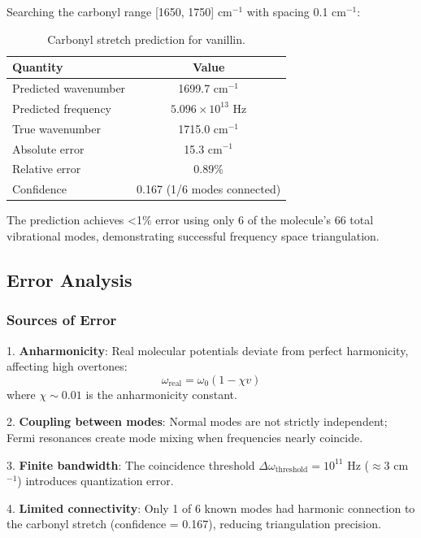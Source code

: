 Searching the carbonyl range [1650, 1750] cm$^{-1}$ with spacing 0.1 cm$^{-1}$:

\begin{table}[h]
\centering
\begin{tabular}{|l|c|}
\hline
\textbf{Quantity} & \textbf{Value} \\
\hline
Predicted wavenumber & 1699.7 cm$^{-1}$ \\
Predicted frequency & $5.096 \times 10^{13}$ Hz \\
True wavenumber & 1715.0 cm$^{-1}$ \\
Absolute error & 15.3 cm$^{-1}$ \\
Relative error & 0.89\% \\
Confidence & 0.167 (1/6 modes connected) \\
\hline
\end{tabular}
\caption{Carbonyl stretch prediction for vanillin.}
\end{table}

The prediction achieves <1\% error using only 6 of the molecule's 66 total vibrational modes, demonstrating successful frequency space triangulation.

\subsection{Error Analysis}

\subsubsection{Sources of Error}

1. \textbf{Anharmonicity}: Real molecular potentials deviate from perfect harmonicity, affecting high overtones:
\begin{equation}
\omega_{\text{real}} = \omega_0(1 - \chi v)
\end{equation}
where $\chi \sim 0.01$ is the anharmonicity constant.

2. \textbf{Coupling between modes}: Normal modes are not strictly independent; Fermi resonances create mode mixing when frequencies nearly coincide.

3. \textbf{Finite bandwidth}: The coincidence threshold $\Delta\omega_{\text{threshold}} = 10^{11}$ Hz ($\approx 3$ cm$^{-1}$) introduces quantization error.

4. \textbf{Limited connectivity}: Only 1 of 6 known modes had harmonic connection to the carbonyl stretch (confidence = 0.167), reducing triangulation precision.

